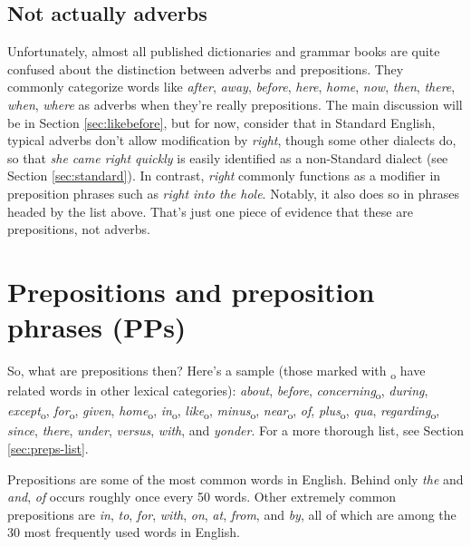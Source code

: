 \subsection{Not actually adverbs}
Unfortunately, almost all published dictionaries and grammar books are quite confused about the distinction between adverbs and prepositions. They commonly categorize words like \textit{after}, \textit{away}, \textit{before}, \textit{here}, \textit{home}, \textit{now}, \textit{then}, \textit{there}, \textit{when}, \textit{where} as adverbs when they're really prepositions. The main discussion will be in Section \ref{sec:likebefore}, but for now, consider that in Standard English, typical adverbs don't allow modification by \textit{right}, though some other dialects do, so that \textit{she came right quickly} is easily identified as a non-Standard dialect (see Section \ref{sec:standard}). In contrast, \textit{right} commonly functions as a modifier in preposition phrases such as \textit{right into the hole}. Notably, it also does so in phrases headed by the list above. That's just one piece of evidence that these are prepositions, not adverbs.


\section{Prepositions and preposition phrases (PPs)} \label{sec:prepositions}

So, what are prepositions then? Here's a sample (those marked with \textsubscript{o} have related words in other lexical categories):
\textit{about}, \textit{before}, \textit{concerning}\textsubscript{o}, \textit{during}, \textit{except}\textsubscript{o}, \textit{for}\textsubscript{o}, \textit{given}, \textit{home}\textsubscript{o}, \textit{in}\textsubscript{o}, \textit{like}\textsubscript{o}, \textit{minus}\textsubscript{o}, \textit{near}\textsubscript{o}, \textit{of}, \textit{plus}\textsubscript{o}, \textit{qua}, \textit{regarding}\textsubscript{o}, \textit{since}, \textit{there}, \textit{under}, \textit{versus}, \textit{with}, and \textit{yonder}. For a more thorough list, see Section \ref{sec:preps-list}.


Prepositions are some of the most common words in English. Behind only \textit{the} and \textit{and}, \textit{of} occurs roughly once every 50 words. Other extremely common prepositions are \textit{in}, \textit{to}, \textit{for}, \textit{with}, \textit{on}, \textit{at}, \textit{from}, and \textit{by}, all of which are among the 30 most frequently used words in English. 

